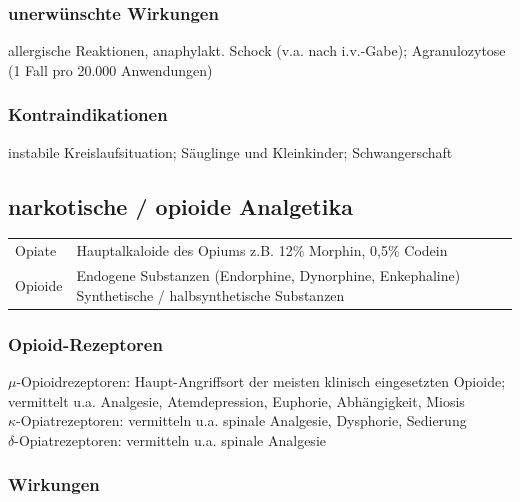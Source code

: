 \documentclass[10pt,a4paper]{report}
\begin{document}
\subsubsection{unerwünschte Wirkungen} %
\label{par:unerw_nschte_wirkungen}
allergische Reaktionen, anaphylakt. Schock (v.a. nach i.v.-Gabe); Agranulozytose (1 Fall pro 20.000 Anwendungen)
\subsubsection{Kontraindikationen} %
\label{par:kontraindikationen}
instabile Kreislaufsituation; Säuglinge und Kleinkinder; Schwangerschaft
\subsection{narkotische / opioide Analgetika} %
\label{sub:narkotische_opioide_analgetika}
\begin{tabularx}{\textwidth}{lX}
Opiate&Hauptalkaloide des Opiums z.B. 12\% Morphin, 0,5\% Codein\\
Opioide&Endogene Substanzen (Endorphine, Dynorphine, Enkephaline) Synthetische / halbsynthetische Substanzen\\
\end{tabularx}
\subsubsection{Opioid-Rezeptoren} %
\label{par:opioid_rezeptoren}
$\mu$-Opioidrezeptoren: Haupt-Angriffsort der meisten klinisch eingesetzten Opioide; vermittelt u.a. Analgesie, Atemdepression, Euphorie, Abhängigkeit, Miosis \\
$\kappa$-Opiatrezeptoren: vermitteln u.a. spinale Analgesie, Dysphorie, Sedierung\\
$\delta$-Opiatrezeptoren: vermitteln u.a. spinale Analgesie
\subsubsection{Wirkungen} %
\label{par:wirkungen}
\end{document}
